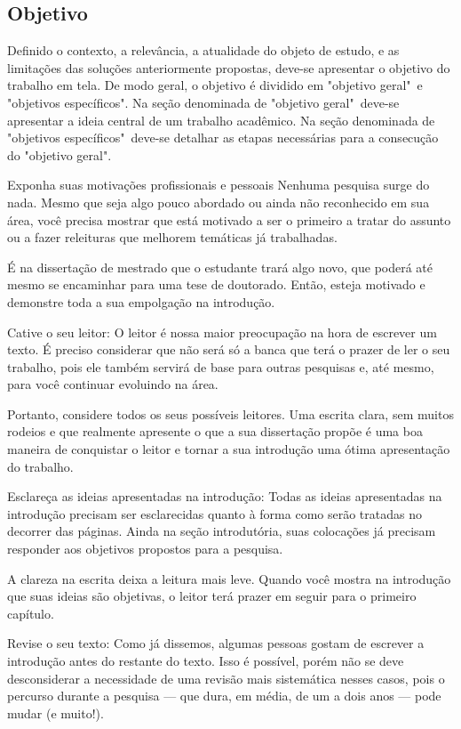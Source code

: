 \subsection{Objetivo}
Definido o contexto, a relevância, a atualidade do objeto de estudo, e as limitações das soluções anteriormente propostas, deve-se apresentar o objetivo do trabalho em tela. De modo geral, o objetivo é dividido em "objetivo geral"\ e "objetivos específicos". Na seção denominada de "objetivo geral"\ deve-se apresentar a ideia central de um trabalho acadêmico. Na seção denominada de "objetivos específicos"\ deve-se detalhar as etapas necessárias para a consecução do "objetivo geral".

Exponha suas motivações profissionais e pessoais
Nenhuma pesquisa surge do nada. Mesmo que seja algo pouco abordado ou ainda não reconhecido em sua área, você precisa mostrar que está motivado a ser o primeiro a tratar do assunto ou a fazer releituras que melhorem temáticas já trabalhadas.

É na dissertação de mestrado que o estudante trará algo novo, que poderá até mesmo se encaminhar para uma tese de doutorado. Então, esteja motivado e demonstre toda a sua empolgação na introdução.

Cative o seu leitor: O leitor é nossa maior preocupação na hora de escrever um texto. É preciso considerar que não será só a banca que terá o prazer de ler o seu trabalho, pois ele também servirá de base para outras pesquisas e, até mesmo, para você continuar evoluindo na área.

Portanto, considere todos os seus possíveis leitores. Uma escrita clara, sem muitos rodeios e que realmente apresente o que a sua dissertação propõe é uma boa maneira de conquistar o leitor e tornar a sua introdução uma ótima apresentação do trabalho.

Esclareça as ideias apresentadas na introdução: Todas as ideias apresentadas na introdução precisam ser esclarecidas quanto à forma como serão tratadas no decorrer das páginas. Ainda na seção introdutória, suas colocações já precisam responder aos objetivos propostos para a pesquisa.

A clareza na escrita deixa a leitura mais leve. Quando você mostra na introdução que suas ideias são objetivas, o leitor terá prazer em seguir para o primeiro capítulo.

Revise o seu texto: Como já dissemos, algumas pessoas gostam de escrever a introdução antes do restante do texto. Isso é possível, porém não se deve desconsiderar a necessidade de uma revisão mais sistemática nesses casos, pois o percurso durante a pesquisa — que dura, em média, de um a dois anos — pode mudar (e muito!).

